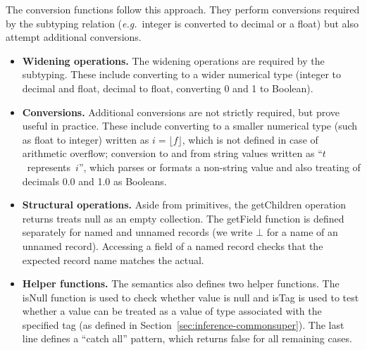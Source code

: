\documentclass[preprint]{sigplanconf}
\newcommand{\kvd}[1]{\textnormal{\textcolor{kvdclr}{\sffamily #1}}}
\newcommand{\ident}[1]{\textnormal{\sffamily #1}}
\begin{document}
The conversion functions follow this approach. They perform conversions required by the subtyping relation
(\emph{e.g.}~integer is converted to decimal or a float) but also attempt additional conversions.

\begin{itemize}
\item \textbf{Widening operations.} The widening operations are required by the subtyping. These include
  converting to a wider numerical type (integer to decimal and float, decimal to float, converting 0 and 
  1 to Boolean).

\item \textbf{Conversions.} Additional conversions are not strictly required, but prove useful in practice.
  These include converting to a smaller numerical type (such as float to integer) written as $i=\lfloor f\rfloor$,
  which is not defined in case of arithmetic overflow; conversion to and from string values written as
  ``$t$~represents~$i$'', which parses or formats a non-string value and also treating of decimals 
  0.0 and 1.0 as Booleans.

\item \textbf{Structural operations.} Aside from primitives, the \ident{getChildren} operation returns treats
  \kvd{null} as an empty collection. The \ident{getField} function is defined separately for named and unnamed
  records (we write $\bot$ for a name of an unnamed record). Accessing a field of a named record checks that 
  the expected record name matches the actual.

\item \textbf{Helper functions.} The semantics also defines two helper functions. The \ident{isNull} function
  is used to check whether value is \kvd{null} and \ident{isTag} is used to test whether a value can be treated 
  as a value of type associated with the specified tag (as defined in Section~\ref{sec:inference-commonsuper}).
  The last line defines a ``catch all'' pattern, which returns \kvd{false} for all remaining cases.
\end{itemize}

\end{document}
